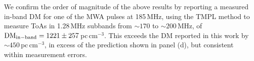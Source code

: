 \documentclass[preprint2,linenumbers]{aastex631}
\begin{document}
We confirm the order of magnitude of the above results by reporting a measured in-band DM for one of the MWA pulses at 185\,MHz, using the TMPL method to measure ToAs in 1.28\,MHz subbands from ${\sim}170$ to ${\sim}200\,$MHz, of ${\rm DM}_{\rm in-band} = 1221\pm257\,$pc\,cm$^{-3}$.
This exceeds the DM reported in this work by ${\sim}450\,$pc\,cm$^{-3}$, in excess of the prediction shown in panel (d), but consistent within measurement errors.

{}



\end{document}
